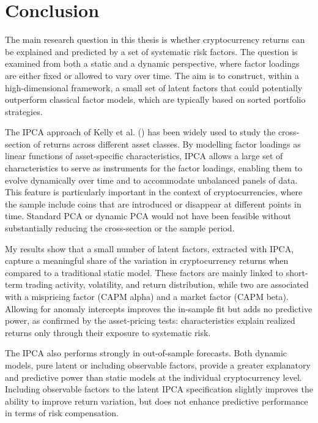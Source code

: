 \documentclass[
  12pt,
  a4paper,
  openany]{scrbook}
\begin{document}

\chapter{Conclusion}\label{conclusion}

The main research question in this thesis is whether cryptocurrency
returns can be explained and predicted by a set of systematic risk
factors. The question is examined from both a static and a dynamic
perspective, where factor loadings are either fixed or allowed to vary
over time. The aim is to construct, within a high-dimensional framework,
a small set of latent factors that could potentially outperform
classical factor models, which are typically based on sorted portfolio
strategies.

The IPCA approach of Kelly et al.
() has been widely used
to study the cross-section of returns across different asset classes. By
modelling factor loadings as linear functions of asset-specific
characteristics, IPCA allows a large set of characteristics to serve as
instruments for the factor loadings, enabling them to evolve dynamically
over time and to accommodate unbalanced panels of data. This feature is
particularly important in the context of cryptocurrencies, where the
sample include coins that are introduced or disappear at different
points in time. Standard PCA or dynamic PCA would not have been feasible
without substantially reducing the cross-section or the sample period.

My results show that a small number of latent factors, extracted with
IPCA, capture a meaningful share of the variation in cryptocurrency
returns when compared to a traditional static model. These factors are
mainly linked to short-term trading activity, volatility, and return
distribution, while two are associated with a mispricing factor (CAPM
alpha) and a market factor (CAPM beta). Allowing for anomaly intercepts
improves the in-sample fit but adds no predictive power, as confirmed by
the asset-pricing tests: characteristics explain realized returns only
through their exposure to systematic risk.

The IPCA also performs strongly in out-of-sample forecasts. Both dynamic
models, pure latent or including observable factors, provide a greater
explanatory and predictive power than static models at the individual
cryptocurrency level. Including observable factors to the latent IPCA
specification slightly improves the ability to improve return variation,
but does not enhance predictive performance in terms of risk
compensation.
\end{document}
